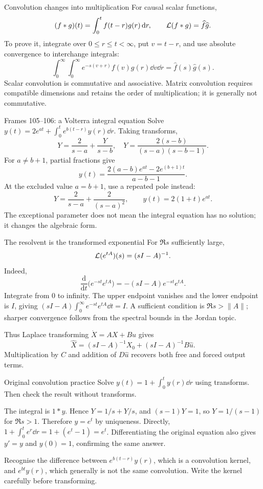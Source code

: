 \begin{concept}{Convolution changes into multiplication}
For causal scalar functions,
\[(f*g)(t)=\int_0^t f(t-r)g(r)\,\mathrm d r,\qquad\mathcal L(f*g)=\widehat f\widehat g.\]
To prove it, integrate over $0\leq r\leq t<\infty$, put $v=t-r$, and use absolute convergence to interchange integrals:
\[\int_0^\infty\!\int_0^\infty e^{-s(v+r)}f(v)g(r)\dd v\dd r=\widehat f(s)\widehat g(s).\]
Scalar convolution is commutative and associative. Matrix convolution requires compatible dimensions and retains the order of multiplication; it is generally not commutative.
\end{concept}
\begin{worked}{Frames 105--106: a Volterra integral equation}
Solve $y(t)=2e^{at}+\int_0^t e^{b(t-r)}y(r)\dd r$. Taking transforms,
\[Y=\frac2{s-a}+\frac{Y}{s-b},\quad Y=\frac{2(s-b)}{(s-a)(s-b-1)}.\]
For $a\ne b+1$, partial fractions give
\[y(t)=\frac{2(a-b)e^{at}-2e^{(b+1)t}}{a-b-1}.\]
At the excluded value $a=b+1$, use a repeated pole instead:
\[Y=\frac2{s-a}+\frac2{(s-a)^2},\qquad y(t)=2(1+t)e^{at}.\]
The exceptional parameter does not mean the integral equation has no solution; it changes the algebraic form.
\end{worked}
\begin{concept}{The resolvent is the transformed exponential}
For $\Re s$ sufficiently large,
\[\mathcal L(e^{tA})(s)=(sI-A)^{-1}.\]
Indeed,
\[\frac{\mathrm d}{\mathrm dt}\big(e^{-st}e^{tA}\big)=-(sI-A)e^{-st}e^{tA}.\]
Integrate from $0$ to infinity. The upper endpoint vanishes and the lower endpoint is $I$, giving $(sI-A)\int_0^\infty e^{-st}e^{tA}\dd t=I$. A sufficient condition is $\Re s>\|A\|$; sharper convergence follows from the spectral bounds in the Jordan topic.

Thus Laplace transforming $\dot X=AX+Bu$ gives
\[\widehat X=(sI-A)^{-1}X_0+(sI-A)^{-1}B\widehat u.\]
Multiplication by $C$ and addition of $D\widehat u$ recovers both free and forced output terms.
\end{concept}
\begin{question}{Original convolution practice}
Solve $y(t)=1+\int_0^t y(r)\dd r$ using transforms. Then check the result without transforms.
\end{question}
\begin{answer}
The integral is $1*y$. Hence $Y=1/s+Y/s$, and $(s-1)Y=1$, so $Y=1/(s-1)$ for $\Re s>1$. Therefore $y=e^t$ by uniqueness. Directly, $1+\int_0^t e^r\dd r=1+(e^t-1)=e^t$. Differentiating the original equation also gives $y'=y$ and $y(0)=1$, confirming the same answer.
\end{answer}
\begin{tip}
Recognise the difference between $e^{b(t-r)}y(r)$, which is a convolution kernel, and $e^{bt}y(r)$, which generally is not the same convolution. Write the kernel carefully before transforming.
\end{tip}

